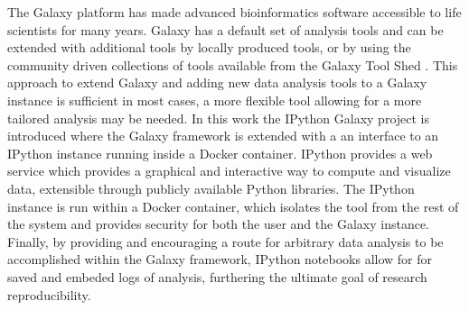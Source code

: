 \documentclass{bioinfo}
\begin{document}
The Galaxy platform \citep{Blank2010,Giardine2005,Goecks2010} has made advanced bioinformatics software accessible to life scientists for many years. Galaxy has a default set of analysis tools and can be extended with additional tools by locally produced tools, or by using the community driven collections of tools available from the Galaxy Tool Shed \citep{Blankenber2014}. This approach to extend Galaxy and adding new data analysis tools to a Galaxy instance is sufficient in most cases, a more flexible tool allowing for a more tailored analysis may be needed. In this work the IPython Galaxy project is introduced where the Galaxy framework is extended with a an interface to an IPython \citep{Perez2007} instance running inside a Docker container. IPython provides a web service which provides a graphical and interactive way to compute and visualize data, extensible through publicly available Python libraries. The IPython instance is run within a Docker container, which isolates the tool from the rest of the system and provides security for both the user and the Galaxy instance. Finally, by providing and encouraging a route for arbitrary data analysis to be accomplished within the Galaxy framework, IPython notebooks allow for for saved and embeded logs of analysis, furthering the ultimate goal of research reproducibility.
\end{document}
